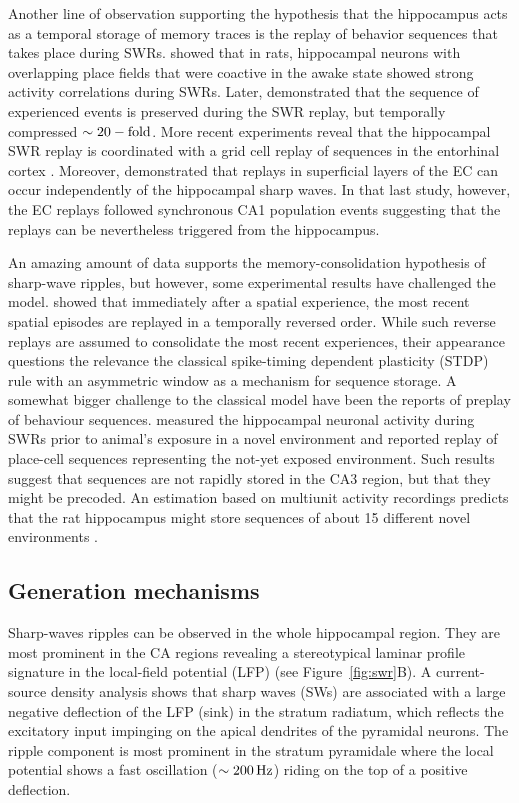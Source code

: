     Another line of observation supporting the hypothesis that the hippocampus
    acts as a temporal storage of memory traces is the replay of behavior
    sequences that takes place during SWRs. \cite{Wilson1994} showed that
    in rats, hippocampal neurons with overlapping place fields that were
    coactive in the awake state showed strong activity correlations during
    SWRs. Later, \cite{Lee2002} demonstrated that the sequence of experienced
    events is preserved during the SWR replay, but temporally compressed $\sim
    20-\rm fold$. More recent experiments reveal that the hippocampal SWR
    replay is coordinated with a grid cell replay of sequences in the
    entorhinal cortex \citep{Olafsdottir2016}. Moreover, \cite{Oneill2017}
    demonstrated that replays in superficial layers of the EC can occur
    independently of the hippocampal sharp waves. In that last study, however,
    the EC replays followed synchronous CA1 population events suggesting that
    the replays can be nevertheless triggered from the hippocampus.

    An amazing amount of data supports the memory-consolidation hypothesis of
    sharp-wave ripples, but however, some experimental results have challenged
    the model. \cite{Foster2006} showed that immediately after a spatial
    experience, the most recent spatial episodes are replayed in a temporally
    reversed order. While such reverse replays are assumed to consolidate the
    most recent experiences, their appearance questions the relevance the
    classical spike-timing dependent plasticity (STDP) rule with an asymmetric
    window \citep{Bi1998} as a mechanism for sequence storage. A somewhat
    bigger challenge to the classical model have been the reports of preplay of
    behaviour sequences. \cite{Dragoi2011} measured the hippocampal neuronal activity
    during SWRs prior to animal's exposure in a novel environment and reported
    replay of place-cell sequences representing the not-yet exposed
    environment. Such results suggest that sequences are not rapidly stored in
    the CA3 region, but that they might be precoded. An estimation based on
    multiunit activity recordings predicts that the rat hippocampus might store
    sequences of about 15 different novel environments \citep{Dragoi2013}.
    
  \subsection{Generation mechanisms}
    Sharp-waves ripples can be observed in the whole hippocampal region. They
    are most prominent in the CA regions revealing a stereotypical laminar
    profile signature in the local-field potential (LFP) (see
    Figure~\ref{fig:swr}B). A current-source density analysis shows that sharp
    waves (SWs) are associated with a large negative deflection of the LFP
    (sink) in the stratum radiatum, which reflects the excitatory input
    impinging on the apical dendrites of the pyramidal neurons. The ripple
    component is most prominent in the stratum pyramidale where the local
    potential shows a fast oscillation ($\sim200\rm \, Hz$) riding on the top
    of a positive deflection.

